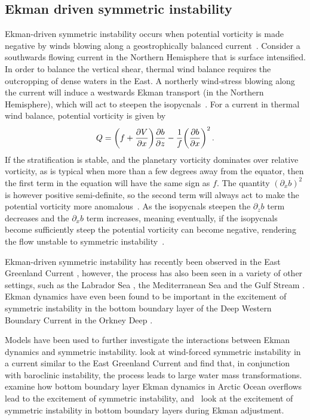 \subsection{Ekman driven symmetric instability}
\label{sec:EkmanInst}
Ekman-driven symmetric instability occurs when potential vorticity is made negative by winds blowing along a geostrophically balanced current~\citep{Thomas2005}. Consider a southwards flowing current in the Northern Hemisphere that is surface intensified. In order to balance the vertical shear, thermal wind balance requires the outcropping of dense waters in the East. A northerly wind-stress blowing along the current will induce a westwards Ekman transport (in the Northern Hemisphere), which will act to steepen the isopycnals~\citep{Allen1996}. For a current in thermal wind balance, potential vorticity is given by
\begin{equation}
    Q = \bigg(f + \pdv{V}{x}\bigg) \pdv{b}{z} - \frac{1}{f} \bigg(\pdv{b}{x} \bigg)^2 \, .
\end{equation}
If the stratification is stable, and the planetary vorticity dominates over relative vorticity, as is typical when more than a few degrees away from the equator, then the first term in the equation will have the same sign as $f$. The quantity $(\partial_x b)^2$ is however positive semi-definite, so the second term will always act to make the potential vorticity more anomalous~\citep{Haine1998}. As the isopycnals steepen the $\partial_zb$ term decreases and the $\partial_x b$ term increases, meaning eventually, if the isopycnals become sufficiently steep the potential vorticity can become negative, rendering the flow unstable to symmetric instability~\citep{Thomas2005}.

Ekman-driven symmetric instability has recently been observed in the East Greenland Current \citep{LeBras2022}, however, the process has also been seen in a variety of other settings, such as the Labrador Sea \citep{Straneo2002}, the Mediterranean Sea \citep{Bosse2021a} and the Gulf Stream \citep{Thomas2013}. Ekman dynamics have even been found to be important in the excitement of symmetric instability in the bottom boundary layer of the Deep Western Boundary Current in the Orkney Deep \citep{Spingys2021}.

Models have been used to further investigate the interactions between Ekman dynamics and symmetric instability. \citet{Spall2016} look at wind-forced symmetric instability in a current similar to the East Greenland Current and find that, in conjunction with baroclinic instability, the process leads to large water mass transformations. \citet{Yankovsky2019} examine how bottom boundary layer Ekman dynamics in Arctic Ocean overflows lead to the excitement of symmetric instability, and~\citet{Wenegrat2020} look at the excitement of symmetric instability in bottom boundary layers during Ekman adjustment.

